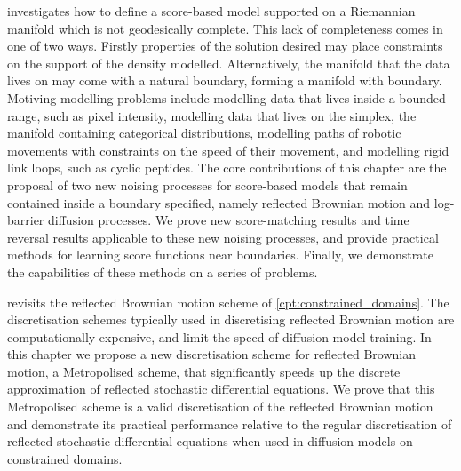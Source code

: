  investigates how to define a score-based model supported on a Riemannian manifold which is not geodesically complete.
This lack of completeness comes in one of two ways.
Firstly properties of the solution desired may place constraints on the support of the density modelled.
Alternatively, the manifold that the data lives on may come with a natural boundary, forming a manifold with boundary.
Motiving modelling problems include modelling data that lives inside a bounded range, such as pixel intensity, modelling data that lives on the simplex, the manifold containing categorical distributions, modelling paths of robotic movements with constraints on the speed of their movement, and modelling rigid link loops, such as cyclic peptides. 
The core contributions of this chapter are the proposal of two new noising processes for score-based models that remain contained inside a boundary specified, namely reflected Brownian motion and log-barrier diffusion processes.
We prove new score-matching results and time reversal results applicable to these new noising processes, and provide practical methods for learning score functions near boundaries.
Finally, we demonstrate the capabilities of these methods on a series of problems.

 revisits the reflected Brownian motion scheme of \cref{cpt:constrained_domains}.
The discretisation schemes typically used in discretising reflected Brownian motion are computationally expensive, and limit the speed of diffusion model training.
In this chapter we propose a new discretisation scheme for reflected Brownian motion, a Metropolised scheme, that significantly speeds up the discrete approximation of reflected stochastic differential equations.
We prove that this Metropolised scheme is a valid discretisation of the reflected Brownian motion and demonstrate its practical performance relative to the regular discretisation of reflected stochastic differential equations when used in diffusion models on constrained domains.


